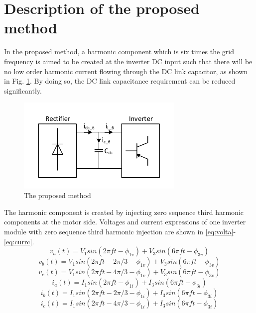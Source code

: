 \documentclass[conference,a4paper,twocolumn]{IEEEtran}
\begin{document}
\section{Description of the proposed method}
In the proposed method, a harmonic component which is six times the grid frequency is aimed to be created at the inverter DC input such that there will be no low order harmonic current flowing through the DC link capacitor, as shown in Fig. \ref{fig:6th}. By doing so, the DC link capacitance requirement can be reduced significantly.
\begin{figure}[htp]
  \centering
  \includegraphics[width=8cm]{images/method}
  \caption{The proposed method}
  \label{fig:6th}
\end{figure}
The harmonic component is created by injecting zero sequence third harmonic components at the motor side. Voltages and current expressions of one inverter module with zero sequence third harmonic injection are shown in \ref{eq:volta}-\ref{eq:currc}.
\begin{equation} \label{eq:volta}
v_a(t) = V_1sin(2\pi ft-\phi_{1v})+V_3sin(6\pi ft-\phi_{3v})
\end{equation}
\begin{equation} \label{voltb}
v_b(t) = V_1sin(2\pi ft-2\pi/3-\phi_{1v})+V_3sin(6\pi ft-\phi_{3v})
\end{equation}
\begin{equation} \label{eq:voltc}
v_c(t) = V_1sin(2\pi ft-4\pi/3-\phi_{1v})+V_3sin(6\pi ft-\phi_{3v})
\end{equation}
\begin{equation} \label{eq:curra}
i_a(t) = I_1sin(2\pi ft-\phi_{1i})+I_3sin(6\pi ft-\phi_{3i})
\end{equation}
\begin{equation} \label{eq:currb}
i_b(t) = I_1sin(2\pi ft-2\pi/3-\phi_{1i})+I_3sin(6\pi ft-\phi_{3i})
\end{equation}
\begin{equation} \label{eq:currc}
i_c(t) = I_1sin(2\pi ft-4\pi/3-\phi_{1i})+I_3sin(6\pi ft-\phi_{3i})
\end{equation}
\end{document}
